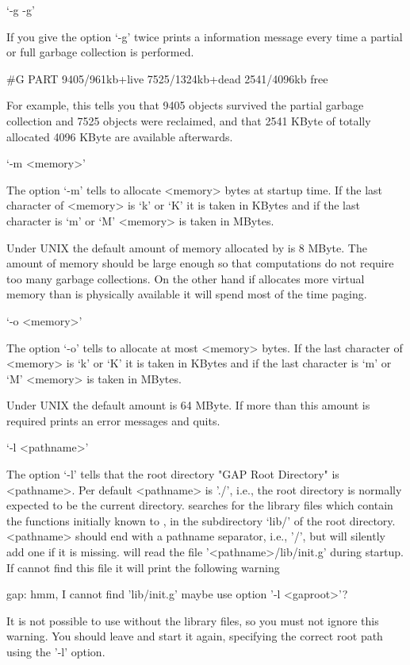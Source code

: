 `-g -g'

If  you  give the option `-g'  twice  {\GAP} prints a information message
every time a partial or full garbage collection is performed.

\begintt
    #G  PART 9405/961kb+live   7525/1324kb+dead   2541/4096kb free
\endtt

For  example,  this  tells you  that  9405  objects survived  the partial
garbage collection and  7525 objects were  reclaimed, and that 2541 KByte
of totally allocated 4096 KByte are available afterwards.

`-m <memory>'

The option `-m' tells {\GAP} to allocate <memory>  bytes at startup time.
If the last character of <memory> is `k' or `K' it is taken in KBytes and
if the last character is `m' or `M' <memory> is taken in MBytes.

Under UNIX the default amount  of memory allocated  by {\GAP} is 8 MByte.
The amount of memory  should be large  enough so that computations do not
require  too  many  garbage  collections.  On the   other hand  if {\GAP}
allocates more virtual memory than  is physically available it will spend
most of  the  time  paging.  

`-o <memory>'

The option `-o' tells {\GAP} to allocate  at most <memory> bytes.  If the
last character of <memory> is `k' or `K' it is taken in KBytes and if the
last character is `m' or `M' <memory> is taken in MBytes.

Under UNIX the  default amount is 64 MByte.   If more than this amount is
required {\GAP} prints an error messages and quits.

`-l <pathname>'

The option `-l' tells  {\GAP}  that the  {\GAP} root directory  "GAP Root
Directory" is <pathname>.  Per default <pathname> is './', i.e., the root
directory is normally   expected  to be the   current  directory.  {\GAP}
searches for the library   files  which contain the functions   initially
known to  {\GAP},  in the   subdirectory `lib/'  of  the  root directory.
<pathname> should end with a   pathname separator, i.e., '/', but  {\GAP}
will silently   add one  if  it is  missing.  {\GAP}   will read the file
'<pathname>/lib/init.g' during startup.  If  {\GAP} cannot find this file
it will print the following warning

\begintt
    gap: hmm, I cannot find 'lib/init.g' maybe use option '-l <gaproot>'?
\endtt

It is not possible  to use {\GAP} without the  library files, so you must
not  ignore this warning.  You  should leave {\GAP}   and start it again,
specifying the correct root path using the '-l' option.

